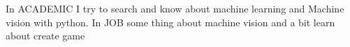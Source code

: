 

\begin{cvparagraph}
In ACADEMIC
\newline I try to search and know about machine learning and Machine vision with python.
\newline\newline
In JOB
\newline
some thing about machine vision and a bit learn about create game



\end{cvparagraph}
